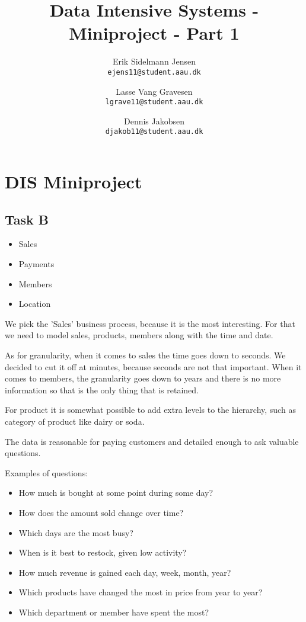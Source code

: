 

\author{
  Erik Sidelmann Jensen\\
  \texttt{ejens11@student.aau.dk}
  \and
  Lasse Vang Gravesen\\
  \texttt{lgrave11@student.aau.dk}
  \and
  Dennis Jakobsen\\
  \texttt{djakob11@student.aau.dk}  
}

\title{Data Intensive Systems - Miniproject - Part 1}
\date{}


	\clearpage\maketitle
	\thispagestyle{empty}
	
	\chapter{DIS Miniproject}
	\section{Task B}
	\begin{itemize}
	\item Sales
	\item Payments
	\item Members
	\item Location
	\end{itemize}
	
	We pick the 'Sales' business process, because it is the most interesting. For that we need to model sales, products, members along with the time and date.
	
	As for granularity, when it comes to sales the time goes down to seconds. We decided to cut it off at minutes, because seconds are not that important. When it comes to members, the granularity goes down to years and there is no more information so that is the only thing that is retained. 
	
	For product it is somewhat possible to add extra levels to the hierarchy, such as category of product like dairy or soda.
	
	The data is reasonable for paying customers and detailed enough to ask valuable questions.
	
	Examples of questions:
	\begin{itemize}
	\item How much is bought at some point during some day?
	\item How does the amount sold change over time?
	\item Which days are the most busy?
	\item When is it best to restock, given low activity?
	\item How much revenue is gained each day, week, month, year?
	\item Which products have changed the most in price from year to year?
	\item Which department or member have spent the most?
	\end{itemize}


